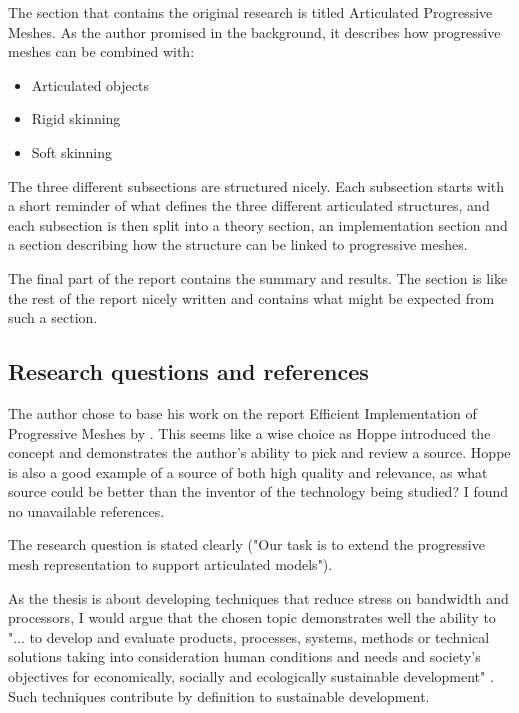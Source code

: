 \documentclass{article}
\begin{document}
The section that contains the original research is titled Articulated
Progressive Meshes. As the author promised in the background, it describes how
progressive meshes can be combined with: 

\begin{itemize}
  \item Articulated objects
  \item Rigid skinning
  \item Soft skinning
\end{itemize}

The three different subsections are structured nicely. Each subsection starts
with a short reminder of what defines the three different articulated
structures, and each subsection is then split into a theory section, an
implementation section and a section describing how the structure can be linked
to progressive meshes.

The final part of the report contains the summary and results. The section is
like the rest of the report nicely written and contains what might be expected
from such a section.

\subsection{Research questions and references}

The author chose to base his work on the report Efficient Implementation of
Progressive Meshes by \citet{hoppe1998}. This seems like a wise choice as Hoppe
introduced the concept \citep{hoppe} and demonstrates the author's ability to
pick and review a source. Hoppe is also a good example of a source of both high
quality and relevance, as what source could be better than the inventor of the
technology being studied? I found no unavailable references.

The research question is stated clearly ("Our task is to extend the
progressive mesh representation to support articulated models").

As the thesis is about developing techniques that reduce stress on bandwidth and
processors, I would argue that the chosen topic demonstrates well the ability to
"... to develop and evaluate products, processes, systems, methods
or technical solutions taking into consideration human conditions and needs and
society's objectives for economically, socially and ecologically sustainable
development" \citep{hogfeldtcivil}. Such techniques contribute by definition to
sustainable development.
\end{document}
